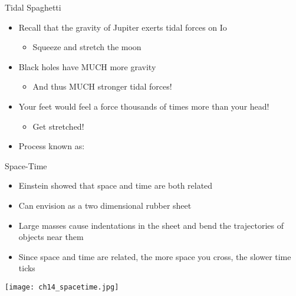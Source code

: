 \documentclass[pdf, aspectratio=169]{beamer}
\begin{document}
\begin{frame}{Tidal Spaghetti}
  \begin{itemize}
	\item Recall that the gravity of Jupiter exerts tidal forces on Io
	  \begin{itemize}
		\item Squeeze and stretch the moon
	  \end{itemize}
	\item Black holes have MUCH more gravity
	  \begin{itemize}
		\item And thus MUCH stronger tidal forces!
	  \end{itemize}
	\item Your feet would feel a force thousands of times more than your head!
	  \begin{itemize}
		\item Get stretched!
	  \end{itemize}
	\item Process known as:\vspace{5mm}
	  \begin{center}
	  \end{center}
  \end{itemize}
\end{frame}

\begin{frame}{Space-Time}
  \begin{itemize}
	\item Einstein showed that space and time are both related
	\item Can envision as a two dimensional rubber sheet
	\item Large masses cause indentations in the sheet and bend the trajectories of objects near them
	\item Since space and time are related, the more space you cross, the slower time ticks
  \end{itemize}
  \begin{center}
	\texttt{[image: ch14\_spacetime.jpg]}
  \end{center}
\end{frame}
\end{document}
